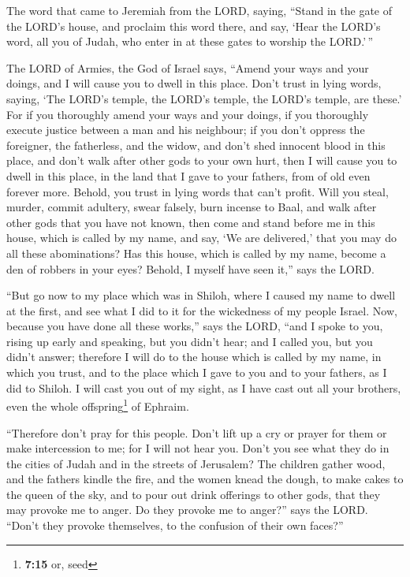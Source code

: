  The word that came to Jeremiah from the LORD, saying,
 ``Stand in the gate of the LORD's house, and proclaim
this word there, and say, `Hear the LORD's word, all you of Judah, who
enter in at these gates to worship the LORD.'\,''

 The LORD of Armies, the God of Israel says, ``Amend your
ways and your doings, and I will cause you to dwell in this place.
 Don't trust in lying words, saying, `The LORD's temple,
the LORD's temple, the LORD's temple, are these.'  For if
you thoroughly amend your ways and your doings, if you thoroughly
execute justice between a man and his neighbour;  if you
don't oppress the foreigner, the fatherless, and the widow, and don't
shed innocent blood in this place, and don't walk after other gods to
your own hurt,  then I will cause you to dwell in this
place, in the land that I gave to your fathers, from of old even forever
more.  Behold, you trust in lying words that can't profit.
 Will you steal, murder, commit adultery, swear falsely,
burn incense to Baal, and walk after other gods that you have not known,
 then come and stand before me in this house, which is
called by my name, and say, `We are delivered,' that you may do all
these abominations?  Has this house, which is called by
my name, become a den of robbers in your eyes? Behold, I myself have
seen it,'' says the LORD.

 ``But go now to my place which was in Shiloh, where I
caused my name to dwell at the first, and see what I did to it for the
wickedness of my people Israel.  Now, because you have
done all these works,'' says the LORD, ``and I spoke to you, rising up
early and speaking, but you didn't hear; and I called you, but you
didn't answer;  therefore I will do to the house which is
called by my name, in which you trust, and to the place which I gave to
you and to your fathers, as I did to Shiloh.  I will cast
you out of my sight, as I have cast out all your brothers, even the
whole offspring\footnote{\textbf{7:15} or, seed} of Ephraim.

 ``Therefore don't pray for this people. Don't lift up a
cry or prayer for them or make intercession to me; for I will not hear
you.  Don't you see what they do in the cities of Judah
and in the streets of Jerusalem?  The children gather
wood, and the fathers kindle the fire, and the women knead the dough, to
make cakes to the queen of the sky, and to pour out drink offerings to
other gods, that they may provoke me to anger.  Do they
provoke me to anger?'' says the LORD. ``Don't they provoke themselves,
to the confusion of their own faces?''


